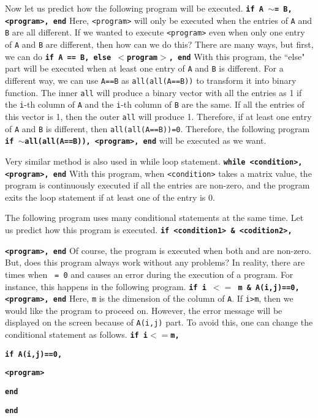 \vv Now let us predict how the following program will be executed. \vv
\texttt{\textbf{if A $\sim$= B, <program>, end}} \vn Here, {\tt <program>} will only be executed when the entries of {\tt A} and {\tt B} are all different. If we wanted to execute {\tt <program>} even when only one entry of {\tt A} and {\tt B} are different, then how can we do this? There are many ways, but first, we can do \vv \texttt{\textbf{if A == B, else $<$program$>$, end}} \vn With this program, the ``else" part will be executed when at least one entry of {\tt A} and {\tt B} is different. For a different way, we can use {\tt A==B} as {\tt all(all(A==B))} to transform it into binary function. The inner {\tt all} will produce a binary vector with all the entries as 1 if the {\tt i}-th column of {\tt A} and the {\tt i}-th column of {\tt B} are the same. If all the entries of this vector is 1, then the outer {\tt all} will produce 1. Therefore, if at least one entry of {\tt A} and {\tt B} is different, then {\tt all(all(A==B))=0}. Therefore, the following program \vv \texttt{\textbf{if $\sim$all(all(A==B)), <program>, end}} \vn will be executed as we want.

\vv Very similar method is also used in while loop statement.
\vv \texttt{\textbf{while <condition>, <program>, end}} \vn With this program, when {\tt <condition>} takes a matrix value, the program is continuously executed if all the entries are non-zero, and the program exits the loop statement if at least one of the entry is 0.

\vv The following program uses many conditional statements at the same time. Let us predict how this program is executed.  \vv \texttt{\textbf{if <condition1> \& <codition2>,}}
\par \texttt{\textbf{<program>, end}} \vn Of course, the program is executed when both {\tt <condition1>} and {\tt <condition2>} are non-zero. But, does this program always work without any problems? In reality, there are times when {\tt <condition1> = 0} and {\tt <condition2>} causes an error during the execution of a program.  For instance, this happens in the following program.  \vv \texttt{\textbf{if i $<=$ m \& A(i,j)==0, <program>, end}} \vn Here, {\tt m} is the dimension of the column of {\tt A}. If {\tt i>m}, then we would like the program to proceed on. However, the error message will be displayed on the screen because of {\tt A(i,j)} part. To avoid this, one can change the conditional statement as follows. \vv \texttt{\textbf{if i$<=$m,}}
\par
 \quad \texttt{\textbf{if A(i,j)==0,}} \par
\qquad \texttt{\textbf{<program>}} \par \quad
\texttt{\textbf{end}} \par \texttt{\textbf{end}}

